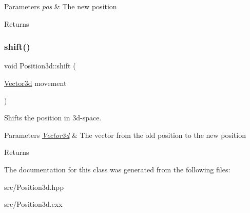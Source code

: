 \begin{DoxyParams}{Parameters}
{\em pos} & The new position\\
\hline
\end{DoxyParams}
\begin{DoxyReturn}{Returns}

\end{DoxyReturn}
\mbox{\label{classPosition3d_a2e0467a0caca224952bdd0a300cbe816}} 
\subsubsection{\texorpdfstring{shift()}{shift()}}
{\footnotesize\ttfamily void Position3d\+::shift (\begin{DoxyParamCaption}\item[{\hyperlink{structVector3d}{Vector3d}}]{movement }\end{DoxyParamCaption})}



Shifts the position in 3d-\/space. 


\begin{DoxyParams}{Parameters}
{\em \hyperlink{structVector3d}{Vector3d}} & The vector from the old position to the new position\\
\hline
\end{DoxyParams}
\begin{DoxyReturn}{Returns}

\end{DoxyReturn}


The documentation for this class was generated from the following files\+:\begin{DoxyCompactItemize}
\item 
src/Position3d.\+hpp\item 
src/Position3d.\+cxx\end{DoxyCompactItemize}
